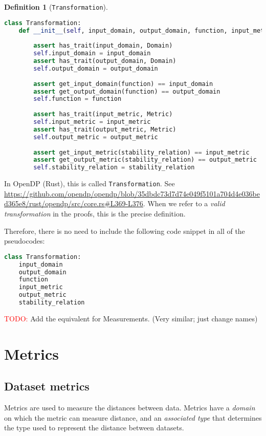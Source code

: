 \documentclass[11pt,a4paper]{article}
\theoremstyle{definition}
\newtheorem{definition}{Definition}[section]
\newcommand{\connor}[1]{{ {\color{teal}{(connor)~#1}}}}
\newcommand{\inOpenDPRust}[2]{In OpenDP (Rust), this is called \texttt{#1}. See \url{#2}.}
\newcommand{\todo}{{\textcolor{red}{TODO: }}}
\begin{document}
\begin{definition}[\texttt{Transformation}]
\connor{Mike helped a lot with this definition, so I'm hopeful it's fully correct, or at least very close.}
\begin{lstlisting}[language=Python]
class Transformation:
    def __init__(self, input_domain, output_domain, function, input_metric, output_metric, stability_relation):
    	
        assert has_trait(input_domain, Domain)
        self.input_domain = input_domain
        assert has_trait(output_domain, Domain)
        self.output_domain = output_domain
        
        assert get_input_domain(function) == input_domain
        assert get_output_domain(function) == output_domain
        self.function = function
        
        assert has_trait(input_metric, Metric)
        self.input_metric = input_metric
        assert has_trait(output_metric, Metric)
        self.output_metric = output_metric
        
        assert get_input_metric(stability_relation) == input_metric
        assert get_output_metric(stability_relation) == output_metric
        self.stability_relation = stability_relation
\end{lstlisting}
    
    \inOpenDPRust{Transformation}{https://github.com/opendp/opendp/blob/35dbdc73d7d74e049f5101a704d4e036bed365e8/rust/opendp/src/core.rs\#L369-L376} When we refer to a \textit{valid transformation} in the proofs, this is the precise definition.
\end{definition}

Therefore, there is no need to include the following code snippet in all of the pseudocodes:
\begin{lstlisting}[language=Python]
class Transformation:
    input_domain
    output_domain
    function
    input_metric
    output_metric
    stability_relation 
\end{lstlisting}

\todo{Add the equivalent for Measurements. (Very similar; just change names)}

\section{Metrics}
\subsection{Dataset metrics}
Metrics are used to measure the distances between data. Metrics have a \emph{domain} on which the metric can measure distance, and an \emph{associated type} that determines the type used to represent the distance between datasets.
\end{document}
